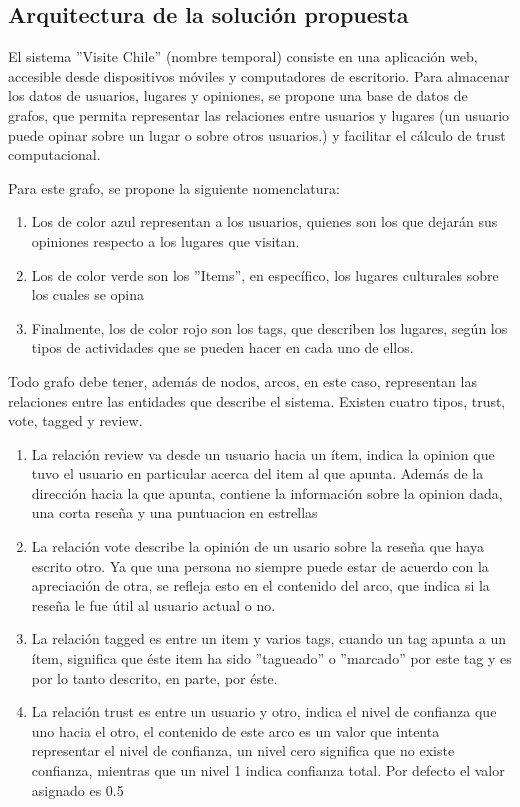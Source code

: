 \subsection{Arquitectura de la solución propuesta} 

El sistema ''Visite Chile'' (nombre temporal) consiste en una aplicación web, accesible desde dispositivos móviles y computadores de escritorio. Para almacenar los datos de usuarios, lugares y opiniones, se propone una base de datos de grafos, que permita representar las relaciones entre usuarios y lugares (un usuario puede opinar sobre un lugar o sobre otros usuarios.) y facilitar el cálculo de trust computacional. 

Para este grafo, se propone la siguiente nomenclatura:

\begin{enumerate}
\item{Los de color azul representan a los usuarios, quienes son los que dejarán sus opiniones respecto a los lugares que visitan.}
\item{Los de color verde son los ''Items'', en específico, los lugares culturales sobre los cuales se opina}
\item{Finalmente, los de color rojo son los tags, que describen los lugares, según los tipos de actividades que se pueden hacer en cada uno de ellos.}
\end{enumerate} 
Todo grafo debe tener, además de nodos, arcos, en este caso, representan las relaciones entre las entidades que describe el sistema. Existen cuatro tipos, trust, vote, tagged y review.
\begin{enumerate}
\item{La relación review va desde un usuario hacia un ítem, indica la opinion que tuvo el usuario en particular acerca del item al que apunta. Además de la dirección hacia la que apunta, contiene la información sobre la opinion dada, una corta reseña y una puntuacion en estrellas}
\item{La relación vote describe la opinión de un usario sobre la reseña que haya escrito otro. Ya que una persona no siempre puede estar de acuerdo con la apreciación de otra, se refleja esto en el contenido del arco, que indica si la reseña le fue útil al usuario actual o no.}
\item{La relación tagged es entre un item y varios tags, cuando un tag apunta a un ítem, significa que éste item ha sido ''tagueado'' o ''marcado'' por este tag y es por lo tanto descrito, en parte, por éste. }
\item{La relación trust es entre un usuario y otro, indica el nivel de confianza que uno hacia el otro, el contenido de este arco es un valor que intenta representar el nivel de confianza, un nivel cero significa que no existe confianza, mientras que un nivel 1 indica confianza total. Por defecto el valor asignado es 0.5}
\end{enumerate}

